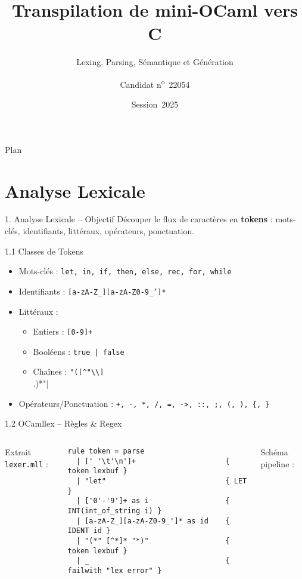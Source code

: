 \documentclass[aspectratio=43]{beamer}
\title{Transpilation de mini-OCaml vers C}
\subtitle{Lexing, Parsing, Sémantique et Génération}
\author{Candidat n\textsuperscript{o}~22054}
\institute{CPGE -- TIPE Informatique}
\date{Session~2025}
\begin{document}
\begin{frame}[plain]
  \titlepage
\end{frame}

\begin{frame}{Plan}
  \tableofcontents
\end{frame}

\section{Analyse Lexicale}
\begin{frame}{1. Analyse Lexicale – Objectif}
Découper le flux de caractères en \textbf{tokens} : mots-clés, identifiants, littéraux, opérateurs, ponctuation.
\end{frame}

\begin{frame}{1.1 Classes de Tokens}
\begin{itemize}
  \item Mots-clés : \texttt{let, in, if, then, else, rec, for, while}
  \item Identifiants : \texttt{[a-zA-Z\_][a-zA-Z0-9\_']*}
  \item Littéraux :
    \begin{itemize}
      \item Entiers : \texttt{[0-9]+}
      \item Booléens : \texttt{true | false}
      \item Chaînes : \verb|"([^"\\]|\\.)*"|
    \end{itemize}
  \item Opérateurs/Ponctuation : \texttt{+, -, *, /, =, ->, ::, ;, (, ), \{, \}}
\end{itemize}
\end{frame}

\begin{frame}[fragile]{1.2 OCamllex – Règles \& Regex}
\begin{columns}
Extrait \texttt{lexer.mll} :
\begin{lstlisting}[style=ocaml]
rule token = parse
  | [' '\t'\n']+                     { token lexbuf }
  | "let"                            { LET }
  | ['0'-'9']+ as i                  { INT(int_of_string i) }
  | [a-zA-Z_][a-zA-Z0-9_']* as id    { IDENT id }
  | "(*" [^*]* "*)"                  { token lexbuf }
  | _                                { failwith "lex error" }
\end{lstlisting}
Schéma pipeline :
\end{columns}
\end{frame}
\end{document}

